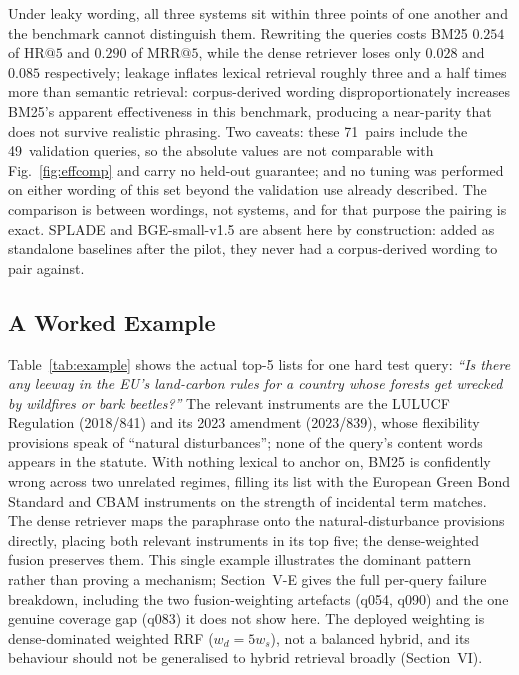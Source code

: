 \documentclass[conference,a4paper]{IEEEtran}
\makeatletter
\newcommand{\HR}[1]{\mathrm{HR}@{#1}}
\newcommand{\MRR}[1]{\mathrm{MRR}@{#1}}
\makeatother
\begin{document}
Under leaky wording, all three systems sit within three points of one
another and the benchmark cannot distinguish them.
Rewriting the queries costs BM25 $0.254$ of $\HR{5}$ and $0.290$ of
$\MRR{5}$, while the dense retriever loses only $0.028$ and $0.085$
respectively; leakage inflates lexical retrieval roughly three and a
half times more than semantic retrieval: corpus-derived wording
disproportionately increases BM25's apparent effectiveness in this
benchmark, producing a near-parity that does not survive realistic
phrasing.
Two caveats: these 71~pairs include the 49~validation queries, so the
absolute values are not comparable with Fig.~\ref{fig:effcomp}
and carry no held-out guarantee; and no tuning was performed on
either wording of this set beyond the validation use already
described.
The comparison is between wordings, not systems, and for that purpose
the pairing is exact.
SPLADE and BGE-small-v1.5 are absent here by construction: added as
standalone baselines after the pilot, they never had a corpus-derived
wording to pair against.

\subsection{A Worked Example}

Table~\ref{tab:example} shows the actual top-5 lists for one hard
test query: \emph{``Is there any leeway in the EU's land-carbon rules
for a country whose forests get wrecked by wildfires or bark
beetles?''}
The relevant instruments are the LULUCF Regulation (2018/841) and its
2023 amendment (2023/839), whose flexibility provisions speak of
``natural disturbances''; none of the query's content words appears
in the statute.
With nothing lexical to anchor on, BM25 is confidently wrong across
two unrelated regimes, filling its list with the European Green Bond
Standard and CBAM instruments on the strength of incidental term
matches.
The dense retriever maps the paraphrase onto the natural-disturbance
provisions directly, placing both relevant instruments in its top
five; the dense-weighted fusion preserves them.
This single example illustrates the dominant pattern rather than
proving a mechanism; Section~V-E gives the full per-query failure
breakdown, including the two fusion-weighting artefacts (q054, q090)
and the one genuine coverage gap (q083) it does not show here.
The deployed weighting is dense-dominated weighted RRF ($w_d{=}5w_s$),
not a balanced hybrid, and its behaviour should not be generalised to
hybrid retrieval broadly (Section~VI).
\end{document}

